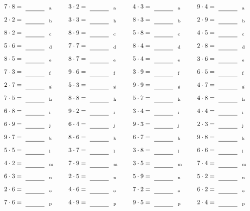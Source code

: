 \documentclass
[
  draft    = true,
  fontsize = 11pt,
  parskip  = half-
]
{scrartcl}
\begin{document}
\par\vfill\par
\begin{align*}
    \pline{7\cdot8}&=\rline{a}
  & \pline{3\cdot2}&=\rline{a}
  & \pline{4\cdot3}&=\rline{a}
  & \pline{9\cdot4}&=\rline{a} \\[1ex]
    \pline{2\cdot2}&=\rline{b}
  & \pline{3\cdot3}&=\rline{b}
  & \pline{8\cdot3}&=\rline{b}
  & \pline{2\cdot9}&=\rline{b} \\[1ex]
    \pline{8\cdot2}&=\rline{c}
  & \pline{8\cdot9}&=\rline{c}
  & \pline{5\cdot8}&=\rline{c}
  & \pline{4\cdot5}&=\rline{c} \\[1ex]
    \pline{5\cdot6}&=\rline{d}
  & \pline{7\cdot7}&=\rline{d}
  & \pline{8\cdot4}&=\rline{d}
  & \pline{2\cdot8}&=\rline{d} \\[1ex]
    \pline{8\cdot5}&=\rline{e}
  & \pline{8\cdot7}&=\rline{e}
  & \pline{5\cdot4}&=\rline{e}
  & \pline{3\cdot6}&=\rline{e} \\[1ex]
    \pline{7\cdot3}&=\rline{f}
  & \pline{9\cdot6}&=\rline{f}
  & \pline{3\cdot9}&=\rline{f}
  & \pline{6\cdot5}&=\rline{f} \\[1ex]
    \pline{2\cdot7}&=\rline{g}
  & \pline{5\cdot3}&=\rline{g}
  & \pline{9\cdot9}&=\rline{g}
  & \pline{4\cdot7}&=\rline{g} \\[1ex]
    \pline{7\cdot5}&=\rline{h}
  & \pline{8\cdot8}&=\rline{h}
  & \pline{5\cdot7}&=\rline{h}
  & \pline{4\cdot8}&=\rline{h} \\[1ex]
    \pline{6\cdot8}&=\rline{i}
  & \pline{9\cdot2}&=\rline{i}
  & \pline{3\cdot4}&=\rline{i}
  & \pline{4\cdot4}&=\rline{i} \\[1ex]
    \pline{6\cdot9}&=\rline{j}
  & \pline{6\cdot4}&=\rline{j}
  & \pline{9\cdot3}&=\rline{j}
  & \pline{2\cdot3}&=\rline{j} \\[1ex]
    \pline{9\cdot7}&=\rline{k}
  & \pline{8\cdot6}&=\rline{k}
  & \pline{6\cdot7}&=\rline{k}
  & \pline{9\cdot8}&=\rline{k} \\[1ex]
    \pline{5\cdot5}&=\rline{l}
  & \pline{3\cdot7}&=\rline{l}
  & \pline{3\cdot8}&=\rline{l}
  & \pline{6\cdot6}&=\rline{l} \\[1ex]
    \pline{4\cdot2}&=\rline{m}
  & \pline{7\cdot9}&=\rline{m}
  & \pline{3\cdot5}&=\rline{m}
  & \pline{7\cdot4}&=\rline{m} \\[1ex]
    \pline{6\cdot3}&=\rline{n}
  & \pline{2\cdot5}&=\rline{n}
  & \pline{5\cdot9}&=\rline{n}
  & \pline{5\cdot2}&=\rline{n} \\[1ex]
    \pline{2\cdot6}&=\rline{o}
  & \pline{4\cdot6}&=\rline{o}
  & \pline{7\cdot2}&=\rline{o}
  & \pline{6\cdot2}&=\rline{o} \\[1ex]
    \pline{7\cdot6}&=\rline{p}
  & \pline{4\cdot9}&=\rline{p}
  & \pline{9\cdot5}&=\rline{p}
  & \pline{2\cdot4}&=\rline{p}
\end{align*}
\end{document}
